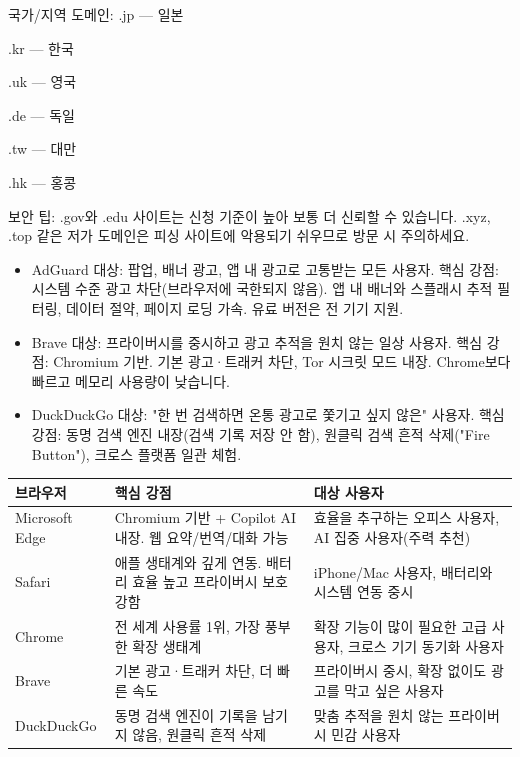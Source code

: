 국가/지역 도메인: .jp — 일본

.kr — 한국

.uk — 영국

.de — 독일

.tw — 대만

.hk — 홍콩

보안 팁: .gov와 .edu 사이트는 신청 기준이 높아 보통 더 신뢰할 수 있습니다. .xyz, .top 같은 저가 도메인은 피싱 사이트에 악용되기 쉬우므로 방문 시 주의하세요.


\begin{itemize}
  \item AdGuard 대상: 팝업, 배너 광고, 앱 내 광고로 고통받는 모든 사용자. 핵심 강점: 시스템 수준 광고 차단(브라우저에 국한되지 않음). 앱 내 배너와 스플래시 추적 필터링, 데이터 절약, 페이지 로딩 가속. 유료 버전은 전 기기 지원.
\end{itemize}


\begin{itemize}
  \item Brave 대상: 프라이버시를 중시하고 광고 추적을 원치 않는 일상 사용자. 핵심 강점: Chromium 기반. 기본 광고·트래커 차단, Tor 시크릿 모드 내장. Chrome보다 빠르고 메모리 사용량이 낮습니다.
  \item DuckDuckGo 대상: "한 번 검색하면 온통 광고로 쫓기고 싶지 않은" 사용자. 핵심 강점: 동명 검색 엔진 내장(검색 기록 저장 안 함), 원클릭 검색 흔적 삭제("Fire Button"), 크로스 플랫폼 일관 체험.
\end{itemize}


\begin{center}
\begin{tabularx}{\linewidth}{|X|X|X|}
\hline
\textbf{브라우저} & \textbf{핵심 강점} & \textbf{대상 사용자} \tabularnewline
\hline
Microsoft Edge & Chromium 기반 + Copilot AI 내장. 웹 요약/번역/대화 가능 & 효율을 추구하는 오피스 사용자, AI 집중 사용자(주력 추천) \tabularnewline
Safari & 애플 생태계와 깊게 연동. 배터리 효율 높고 프라이버시 보호 강함 & iPhone/Mac 사용자, 배터리와 시스템 연동 중시 \tabularnewline
Chrome & 전 세계 사용률 1위, 가장 풍부한 확장 생태계 & 확장 기능이 많이 필요한 고급 사용자, 크로스 기기 동기화 사용자 \tabularnewline
Brave & 기본 광고·트래커 차단, 더 빠른 속도 & 프라이버시 중시, 확장 없이도 광고를 막고 싶은 사용자 \tabularnewline
DuckDuckGo & 동명 검색 엔진이 기록을 남기지 않음, 원클릭 흔적 삭제 & 맞춤 추적을 원치 않는 프라이버시 민감 사용자 \tabularnewline
\hline
\end{tabularx}
\end{center}

